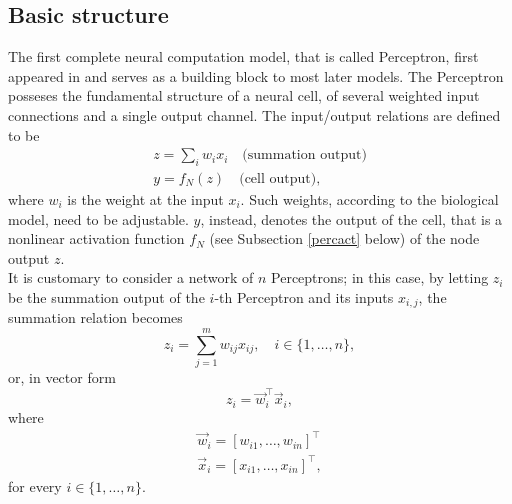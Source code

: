 \documentclass[%
    corpo=11pt,
    twoside,
    stile=classica,
    oldstyle,
    autoretitolo,
    tipotesi=magistrale,
    greek,
    evenboxes,
    english
]{toptesi}
\begin{document}
\subsection{Basic structure}
\label{percbs}
The first complete neural computation model, that is called Perceptron, first appeared in \citep{rosenblatt} and serves as a building block to most later models. The Perceptron posseses the fundamental structure of a neural cell, of several weighted input connections and a single output channel. The input/output relations are defined to be
\begin{align}
z = \sum_{i}w_i x_i \quad \text{(summation output)} \label{summation}\\
y = f_N(z) \quad \text{(cell output)}, \label{nonlinear}
\end{align}
where $w_i$ is the weight at the input $x_i$. Such weights, according to the biological model, need to be adjustable. $y$, instead, denotes the output of the cell, that is a nonlinear activation function $f_N$ (see Subsection \ref{percact} below) of the node output $z$. \\
It is customary to consider a network of $n$ Perceptrons; in this case, by letting $z_i$ be the summation output of the $i$-th Perceptron and its inputs $x_{i,j}$, the summation relation becomes
\begin{equation}
z_i = \sum_{j=1}^{m}w_{ij} x_{ij}, \quad i \in \{1,\dots,n\},
\end{equation}
or, in vector form 
\begin{equation}
\label{percout}
z_i = \vec{w}_i^{\intercal}\vec{x}_i,
\end{equation}
where
\begin{align*}
\vec{w}_i = \left[w_{i1}, \dots, w_{in} \right]^\intercal \\
\vec{x}_i = \left[x_{i1}, \dots, x_{in} \right]^\intercal,
\end{align*}
for every $i \in \{1,\dots,n\}$. 
\end{document}
